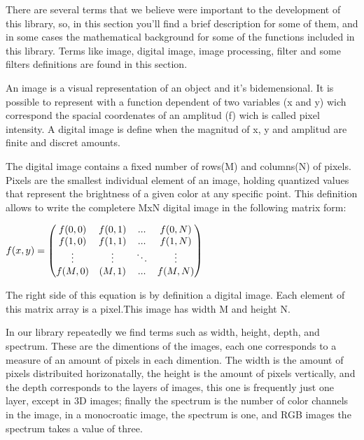 \documentclass[a4paper]{article}
\begin{document}
There are several terms that we believe were important to the development of this library, so, in this section you'll find a brief description for some of them, and in some cases the mathematical background for some of the functions included in this library. Terms like image, digital image, image processing, filter and some filters definitions are found in this section.

An image is a visual representation of an object and it's bidemensional. It is possible to represent with a function dependent of two variables (x and y) wich correspond the spacial coordenates of an amplitud (f) wich is called pixel intensity. A digital image is define when the magnitud of x, y and amplitud are finite and discret amounts.

The digital image contains a fixed number of rows(M) and columns(N) of pixels. Pixels are the smallest individual element of an image, holding quantized values that represent the brightness of a given color at any specific point. This definition allows to write the completere MxN digital image in the following matrix form: \\

\begin{center}
\begin{math}
	\centering
	f(x,y)=
   \begin{pmatrix} 
    f(0,0) & f(0,1) & ... & f(0,N) \\ 
 	f(1,0) & f(1,1) & ... & f(1,N) \\
	\vdots & \vdots & \ddots & \vdots \\
    f(M,0) & (M,1) & ... & f(M,N) \\
   \end{pmatrix}
\end{math}\\
\end{center}

The right side of this equation is by definition a digital image. Each element of this matrix array is a pixel.This image has width M and height N. 

In our library repeatedly we find terms such as width, height, depth, and spectrum. These are the dimentions of the images, each one corresponds to a measure of an amount of pixels in each dimention. The width is the amount of pixels distribuited horizonatally, the height is the amount of pixels vertically, and the depth corresponds to the layers of images, this one is frequently just one layer, except in 3D images; finally the spectrum is the number of color channels in the image, in a monocroatic image, the spectrum is one, and RGB images the spectrum takes a value of three.
\end{document}
